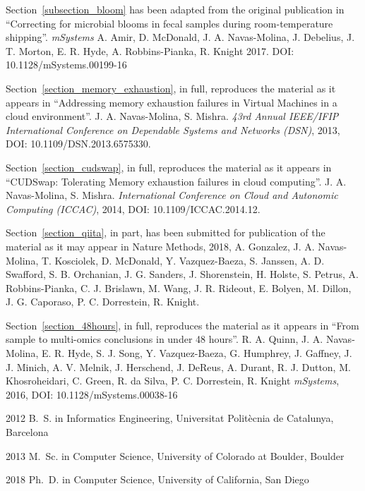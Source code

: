 \begin{frontmatter}
\begin{acknowledgements}
    Section~\ref{subsection_bloom} has been adapted from the original publication in
    ``Correcting for microbial blooms in fecal samples during room-temperature shipping''.
    \emph{mSystems} A. Amir, D. McDonald, J. A. Navas-Molina, J. Debelius, J. T. Morton,
    E. R. Hyde, A. Robbins-Pianka, R. Knight 2017. DOI: 10.1128/mSystems.00199-16

    Section~\ref{section_memory_exhaustion}, in full, reproduces the material as it
    appears in ``Addressing memory exhaustion failures in Virtual Machines in a cloud environment''.
    J. A. Navas-Molina, S. Mishra. \emph{43rd Annual IEEE/IFIP International Conference on Dependable Systems and Networks (DSN)},
    2013, DOI: 10.1109/DSN.2013.6575330.

    Section~\ref{section_cudswap}, in full, reproduces the material as it
    appears in ``CUDSwap: Tolerating Memory exhaustion failures in cloud computing''.
    J. A. Navas-Molina, S. Mishra. \emph{International Conference on Cloud and Autonomic Computing (ICCAC)},
    2014, DOI: 10.1109/ICCAC.2014.12.

    Section~\ref{section_qiita}, in part, has been submitted for publication of the
    material as it may appear in Nature Methods, 2018, A. Gonzalez, J. A. Navas-Molina,
    T. Kosciolek, D. McDonald, Y. Vazquez-Baeza, S. Janssen, A. D. Swafford, S. B. Orchanian,
    J. G. Sanders, J. Shorenstein, H. Holste, S. Petrus, A. Robbins-Pianka, C. J. Brislawn,
    M. Wang, J. R. Rideout, E. Bolyen, M. Dillon, J. G. Caporaso, P. C. Dorrestein, R. Knight.

    Section~\ref{section_48hours}, in full, reproduces the material as it
    appears in ``From sample to multi-omics conclusions in under 48 hours''.
    R. A. Quinn, J. A. Navas-Molina, E. R. Hyde, S. J. Song, Y. Vazquez-Baeza,
    G. Humphrey, J. Gaffney, J. J. Minich, A. V. Melnik, J. Herschend, J. DeReus,
    A. Durant, R. J. Dutton, M. Khosroheidari, C. Green, R. da Silva, P. C. Dorrestein,
    R. Knight \emph{mSystems}, 2016, DOI: 10.1128/mSystems.00038-16

\end{acknowledgements}


%
%
\begin{vitapage}
\begin{vita}
  \item[2012] B.~S. in Informatics Engineering, Universitat Polit\`ecnia de Catalunya, Barcelona
  \item[2013] M.~Sc. in Computer Science, University of Colorado at Boulder, Boulder
  \item[2018] Ph.~D. in Computer Science, University of California, San Diego
\end{vita}



\end{vitapage}
\end{frontmatter}
